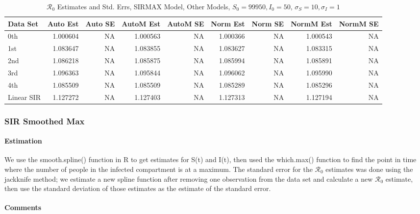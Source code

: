 \documentclass[12pt]{article}
\newcommand{\rr}{\ensuremath{\mathcal{R}_0}}
\begin{document}
\begin{table}[H]
	
	\caption{$\rr$ Estimates and Std. Errs, SIRMAX Model,
		Other Models, $S_0 = 99950, I_0 = 50$, 
		$\sigma_S = 10, \sigma_I = 1$}
	\begin{footnotesize}
		\hskip -1cm
	\begin{tabular}{l|r|r|r|r|r|r|r|r}
		\hline
		Data Set & Auto Est & Auto SE & AutoM Est & AutoM SE & Norm Est & Norm SE & NormM Est & NormM SE\\
		\hline
		0th & 1.000604 & NA & 1.000563 & NA & 1.000366 & NA & 1.000543 & NA\\
		\hline
		1st & 1.083647 & NA & 1.083855 & NA & 1.083627 & NA & 1.083315 & NA\\
		\hline
		2nd & 1.086218 & NA & 1.085875 & NA & 1.085994 & NA & 1.085891 & NA\\
		\hline
		3rd & 1.096363 & NA & 1.095844 & NA & 1.096062 & NA & 1.095990 & NA\\
		\hline
		4th & 1.085509 & NA & 1.085509 & NA & 1.085289 & NA & 1.085296 & NA\\
		\hline
		Linear SIR & 1.127272 & NA & 1.127403 & NA & 1.127313 & NA & 1.127194 & NA\\
		\hline
	\end{tabular}
\end{footnotesize}
\end{table}

\subsubsection{SIR Smoothed Max}

\paragraph{Estimation}

We use the smooth.spline() function in R to get estimates for S(t) and I(t), then used the which.max() function to find the point in time where the number of people in the infected compartment is at a maximum. The standard error for the $\rr$ estimates was done using the jackknife method; we estimate a new spline function after removing one observation from the data set and calculate a new $\rr$ estimate, then use the standard deviation of those estimates as the estimate of the standard error.

\paragraph{Comments}
\end{document}
